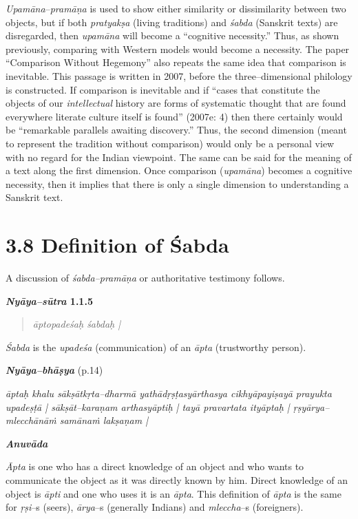 \textit{Upamāna}–\textit{pramāṇa }is used to show either similarity or dissimilarity between two objects, but if both \textit{pratyakṣa }(living traditions) and \textit{śabda }(Sanskrit texts) are disregarded, then \textit{upamāna }will become a “cognitive necessity.” Thus, as shown previously, comparing with Western models would become a necessity. The paper “Comparison Without Hegemony” also repeats the same idea that comparison is inevitable. This passage is written in 2007, before the three–dimensional philology is constructed. If comparison is inevitable and if “cases that constitute the objects of our \textit{intellectual} history are forms of systematic thought that are found everywhere literate culture itself is found” (2007e: 4) then there certainly would be “remarkable parallels awaiting discovery.” Thus, the second dimension (meant to represent the tradition without comparison) would only be a personal view with no regard for the Indian viewpoint. The same can be said for the meaning of a text along the first dimension. Once comparison (\textit{upamāna}) becomes a cognitive necessity, then it implies that there is only a single dimension to understanding a Sanskrit text.


\section*{3.8 Definition of Śabda}

A discussion of \textit{śabda–pramāṇa }or authoritative testimony follows.

\textbf{\textit{Nyāya–sūtra} 1.1.5}

\begin{verse}
\textit{āptopadeśaḥ śabdaḥ |}
\end{verse}

\textit{Śabda} is the \textit{upadeśa} (communication) of an \textit{āpta} (trustworthy person).

\textit{\textbf{Nyāya–bhāṣya}} (p.14)

\begin{myquote}
\textit{āptaḥ khalu sākṣātkṛta–dharmā yathādṛṣṭasyārthasya cikhyāpayiṣayā prayukta upadeṣṭā | sākṣāt–karaṇam arthasyāptiḥ | tayā pravartata ityāptaḥ | ṛṣyārya–mlecchānāṁ samānaṁ lakṣaṇam |}
\end{myquote}

\textit{\textbf{Anuvāda}}

\textit{Āpta} is one who has a direct knowledge of an object and who wants to communicate the object as it was directly known by him. Direct knowledge of an object is \textit{āpti} and one who uses it is an \textit{āpta}. This definition of \textit{āpta} is the same for \textit{ṛṣi}–s (seers), \textit{ārya}–s (generally Indians) and \textit{mleccha}–s (foreigners).


